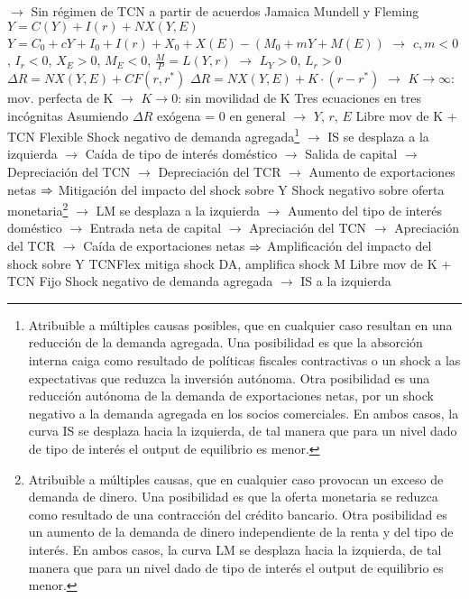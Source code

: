 \documentclass{nuevotema}
\begin{document}
\begin{esquemal}
				\4[] $\to$ Sin régimen de TCN a partir de acuerdos Jamaica
			\3 Mundell y Fleming
				\4[IS] $Y = C(Y) + I(r) + NX(Y,E)$
				\4[] $Y = C_0 + c Y + I_0 + I(r) + X_0 + X(E) - (M_0 + m Y + M(E))$
				\4[] $\to$ $c,m < 0$, $I_r < 0$, $X_E > 0$, $M_E < 0$,
				\4[LM] $\frac{M}{P} = L(Y,r)$
				\4[] $\to$ $L_Y > 0$, $L_r > 0$
				\4[BP] $\Delta R = NX(Y,E) + CF(r, r^*)$
				\4[] $\Delta R = NX(Y,E) + K \cdot (r- r^*)$
				\4[] $\to$ $K \to \infty$: mov. perfecta de K
				\4[] $\to$ $K \to 0$: sin movilidad de K
				\4 Tres ecuaciones en tres incógnitas
				\4[] Asumiendo $\Delta R$ exógena = 0 en general
				\4[] $\to$ $Y$, $r$, $E$
				\4 Libre mov de K + TCN Flexible
				\4[] Shock negativo de demanda agregada\footnote{Atribuible a múltiples causas posibles, que en cualquier caso resultan en una reducción de la demanda agregada. Una posibilidad es que la absorción interna caiga como resultado de políticas fiscales contractivas o un shock a las expectativas que reduzca la inversión autónoma. Otra posibilidad es una reducción autónoma de la demanda de exportaciones netas, por un shock negativo a la demanda agregada en los socios comerciales. En ambos casos, la curva IS se desplaza hacia la izquierda, de tal manera que para un nivel dado de tipo de interés el output de equilibrio es menor.}
				\4[] $\to$ IS se desplaza a la izquierda
				\4[] $\to$ Caída de tipo de interés doméstico
				\4[] $\to$ Salida de capital
				\4[] $\to$ Depreciación del TCN
				\4[] $\to$ Depreciación del TCR
				\4[] $\to$ Aumento de exportaciones netas
				\4[] $\then$ Mitigación del impacto del shock sobre Y
				\4[] Shock negativo sobre oferta monetaria\footnote{Atribuible a múltiples causas, que en cualquier caso provocan un exceso de demanda de dinero. Una posibilidad es que la oferta monetaria se reduzca como resultado de una contracción del crédito bancario. Otra posibilidad es un aumento de la demanda de dinero independiente de la renta y del tipo de interés. En ambos casos, la curva LM  se desplaza hacia la izquierda, de tal manera que para un nivel dado de tipo de interés el output de equilibrio es menor.}
				\4[] $\to$ LM se desplaza a la izquierda
				\4[] $\to$ Aumento del tipo de interés doméstico
				\4[] $\to$ Entrada neta de capital
				\4[] $\to$ Apreciación del TCN
				\4[] $\to$ Apreciación del TCR
				\4[] $\to$ Caída de exportaciones netas
				\4[] $\then$ Amplificación del impacto del shock sobre Y
				\4[$\then$] TCNFlex mitiga shock DA, amplifica shock M
				\4 Libre mov de K + TCN Fijo
				\4[] Shock negativo de demanda agregada
				\4[] $\to$ IS a la izquierda

\end{esquemal}
\end{document}
